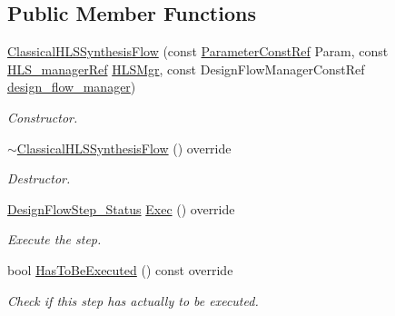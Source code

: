 \subsection*{Public Member Functions}
\begin{DoxyCompactItemize}
\item 
\hyperlink{classClassicalHLSSynthesisFlow_acc0b6e806e6767a7c63b325f6bc4915c}{Classical\+H\+L\+S\+Synthesis\+Flow} (const \hyperlink{Parameter_8hpp_a37841774a6fcb479b597fdf8955eb4ea}{Parameter\+Const\+Ref} Param, const \hyperlink{hls__manager_8hpp_acd3842b8589fe52c08fc0b2fcc813bfe}{H\+L\+S\+\_\+manager\+Ref} \hyperlink{classHLS__step_ade85003a99d34134418451ddc46a18e9}{H\+L\+S\+Mgr}, const Design\+Flow\+Manager\+Const\+Ref \hyperlink{classDesignFlowStep_ab770677ddf087613add30024e16a5554}{design\+\_\+flow\+\_\+manager})
\begin{DoxyCompactList}\small\item\em Constructor. \end{DoxyCompactList}\item 
\hyperlink{classClassicalHLSSynthesisFlow_ae71c64737d2c5c597e3fc5d09d5ed766}{$\sim$\+Classical\+H\+L\+S\+Synthesis\+Flow} () override
\begin{DoxyCompactList}\small\item\em Destructor. \end{DoxyCompactList}\item 
\hyperlink{design__flow__step_8hpp_afb1f0d73069c26076b8d31dbc8ebecdf}{Design\+Flow\+Step\+\_\+\+Status} \hyperlink{classClassicalHLSSynthesisFlow_a719619247564584bd858b259239cffcc}{Exec} () override
\begin{DoxyCompactList}\small\item\em Execute the step. \end{DoxyCompactList}\item 
bool \hyperlink{classClassicalHLSSynthesisFlow_aa0913cd5f8a697a6103d3047dc156886}{Has\+To\+Be\+Executed} () const override
\begin{DoxyCompactList}\small\item\em Check if this step has actually to be executed. \end{DoxyCompactList}\end{DoxyCompactItemize}

